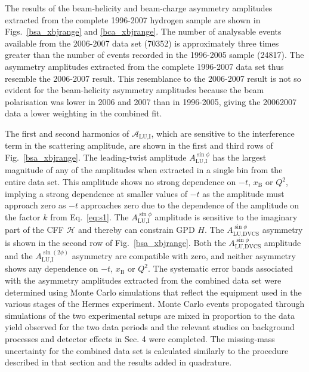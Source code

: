 The results of the beam-helicity and beam-charge asymmetry amplitudes extracted from the complete 1996-2007 hydrogen sample are shown in Figs.~\ref{bsa_xbjrange} and \ref{bca_xbjrange}. The number of analysable events available from the 2006-2007 data set (70352) is approximately three times greater than the number of events recorded in the 1996-2005 sample (24817). The  asymmetry amplitudes extracted from the complete 1996-2007 data set thus resemble the 2006-2007 result. This resemblance to the 2006-2007 result is not so evident for the beam-helicity asymmetry amplitudes because the beam polarisation was lower in 2006 and 2007 than in 1996-2005, giving the 2006\red{-}2007 data a lower weighting in the combined fit.

The first and second harmonics of $\mathcal{A}_{\textrm{LU,I}}$, which are
sensitive to the interference term in the scattering amplitude, are shown in the first and third rows of Fig.~\ref{bsa_xbjrange}. The leading-twist amplitude $A_{\textrm{LU,I}}^{\sin\phi}$ has the largest magnitude of any of the amplitudes when extracted in a single bin from the entire data set. This amplitude shows no strong dependence on $-t$, $x_{\textrm{B}}$ or $Q^{2}$, implying a strong dependence at smaller values of $-t$ as the amplitude must approach zero as $-t$ approaches zero due to the dependence of the amplitude on the factor $k$ from Eq.~\ref{eq:s1}. The $A_{\textrm{LU,I}}^{\sin\phi}$ amplitude is sensitive to the imaginary part of the CFF $\mathcal{H}$ and thereby can constrain GPD $\textit{H}$. The $A_{\textrm{LU,DVCS}}^{\sin\phi}$ asymmetry is shown in the second row of Fig.~\ref{bsa_xbjrange}. Both the $A_{\textrm{LU,DVCS}}^{\sin\phi}$ amplitude and the $A_{\textrm{LU,I}}^{\sin(2\phi)}$ asymmetry are compatible with zero, and neither asymmetry shows any dependence on $-t$, $x_{\textrm{B}}$ or $Q^{2}$. The systematic error bands associated with the asymmetry amplitudes extracted from the combined data set were determined using Monte Carlo simulations that reflect the equipment used in the various stages of the H{\sc ermes} experiment. Monte Carlo events propogated through simulations of the two experimental setups are mixed in proportion to the data yield observed for the two data periods and the relevant studies on background processes and detector effects in Sec. 4 were completed. The missing-mass uncertainty for the combined data set is calculated similarly to the procedure described in that section and the results added in quadrature.

